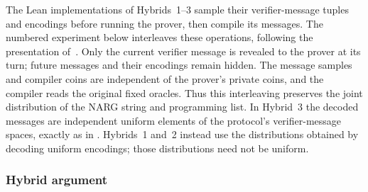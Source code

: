 \begin{remark}
  The Lean implementations of Hybrids~1--3 sample their verifier-message tuples and encodings before running the prover, then compile its messages. The numbered experiment below interleaves these operations, following the presentation of~\cite[Figure~5]{CO25}. Only the current verifier message is revealed to the prover at its turn; future messages and their encodings remain hidden. The message samples and compiler coins are independent of the prover's private coins, and the compiler reads the original fixed oracles. Thus this interleaving preserves the joint distribution of the NARG string and programming list. In Hybrid~3 the decoded messages are independent uniform elements of the protocol's verifier-message spaces, exactly as in . Hybrids~1 and~2 instead use the distributions obtained by decoding uniform encodings; those distributions need not be uniform.
\end{remark}

\subsubsection{Hybrid argument}

